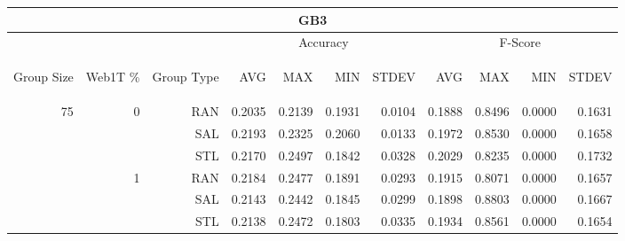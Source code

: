 \begin{center}
\begin{table}[htbp]
\begin{tabular}{ | r | r | r | r | r | r | r | r | r | r | r |}
\hline
\multicolumn{11}{|c|}{GB3}\\
\hline
 & & & \multicolumn{4}{|c|}{Accuracy} & \multicolumn{4}{|c|}{F-Score}\\ \cline{4-11}
\begin{sideways}Group Size\end{sideways} & \begin{sideways}Web1T \%\end{sideways} & \begin{sideways}Group Type\end{sideways} & \begin{sideways}AVG\end{sideways} & \begin{sideways}MAX\end{sideways} & \begin{sideways}MIN\end{sideways} & \begin{sideways}STDEV\end{sideways} & \begin{sideways}AVG\end{sideways} & \begin{sideways}MAX\end{sideways} & \begin{sideways}MIN\end{sideways} & \begin{sideways}STDEV\end{sideways}\\
\hline
\multirow{12}{*}{75}
 & \multirow{3}{*}{0} & RAN & 0.2035 & 0.2139 & 0.1931 & 0.0104 & 0.1888 & 0.8496 & 0.0000 & 0.1631\\ \cline{3-11}
 &   & SAL & 0.2193 & 0.2325 & 0.2060 & 0.0133 & 0.1972 & 0.8530 & 0.0000 & 0.1658\\ \cline{3-11}
 &   & STL & 0.2170 & 0.2497 & 0.1842 & 0.0328 & 0.2029 & 0.8235 & 0.0000 & 0.1732\\ \cline{2-11}
 & \multirow{3}{*}{1} & RAN & 0.2184 & 0.2477 & 0.1891 & 0.0293 & 0.1915 & 0.8071 & 0.0000 & 0.1657\\ \cline{3-11}
 &   & SAL & 0.2143 & 0.2442 & 0.1845 & 0.0299 & 0.1898 & 0.8803 & 0.0000 & 0.1667\\ \cline{3-11}
 &   & STL & 0.2138 & 0.2472 & 0.1803 & 0.0335 & 0.1934 & 0.8561 & 0.0000 & 0.1654\\ \cline{2-11}

\end{tabular}
\end{table}
\end{center}
